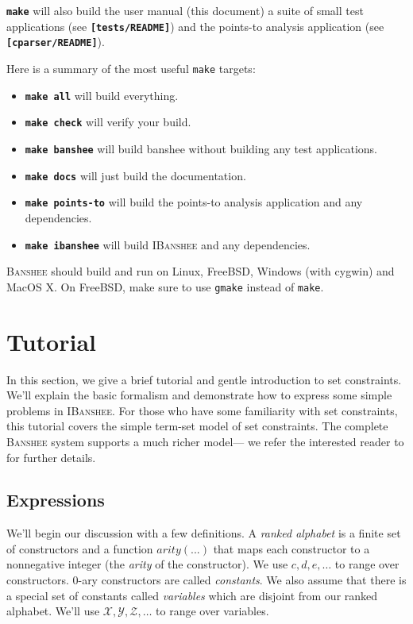 \documentclass[10pt]{article}
\newcommand{\banshee}{\textsc{Banshee}}
\newcommand{\ibanshee}{\textsc{IBanshee}}
\newcommand{\file}[1]{\texttt{\textbf{[#1]}}}
\newcommand{\cmd}[1]{\texttt{\textbf{#1}}}
\newcommand{\var}[1]{\mathcal{#1}}
\begin{document}
\cmd{make} will also build the user manual (this document) a suite of
small test applications (see \file{tests/README}) and the points-to
analysis application (see \file{cparser/README}).

Here is a summary of the most useful \texttt{make} targets:

\begin{itemize}
\item \cmd{make all} will build everything.
\item \cmd{make check} will verify your build.
\item \cmd{make banshee} will build banshee without building any test
  applications.
\item \cmd{make docs} will just build the documentation.
\item \cmd{make points-to} will build the points-to analysis
  application and any dependencies.
\item \cmd{make ibanshee} will build \ibanshee{} and any dependencies.
\end{itemize}

\banshee{} should build and run on Linux, FreeBSD, Windows (with
cygwin) and MacOS X. On FreeBSD, make sure to use \texttt{gmake}
instead of \texttt{make}.

\section{Tutorial}
\label{sec-tutorial}

In this section, we give a brief tutorial and gentle introduction to
set constraints. We'll explain the basic formalism and demonstrate how
to express some simple problems in \ibanshee{}. For those who have
some familiarity with set constraints, this tutorial covers the simple
term-set model of set constraints. The complete \banshee{} system
supports a much richer model--- we refer the interested reader to
\cite{fahndrich:sas97,fahndrich:thesis} for further details.

\subsection{Expressions}

We'll begin our discussion with a few definitions. A \emph{ranked
  alphabet} is a finite set of constructors and a function
$arity(...)$ that maps each constructor to a nonnegative integer (the
\emph{arity} of the constructor). We use $c,d,e,\ldots$ to range over
constructors. $0$-ary constructors are called \emph{constants}. We
also assume that there is a special set of constants called
\emph{variables} which are disjoint from our ranked alphabet. We'll
use $\var{X}, \var{Y}, \var{Z}, \ldots$ to range over variables.
\end{document}
